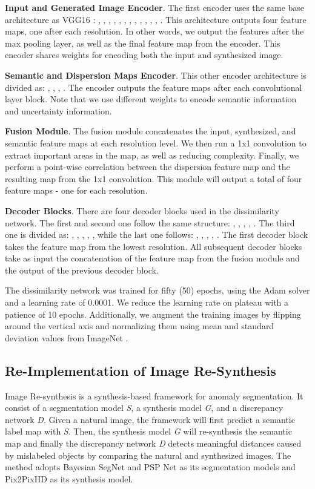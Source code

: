 \documentclass[final]{cvpr}
\begin{document}
\textbf{Input and Generated Image Encoder}. The first encoder uses the same base architecture as VGG16 \cite{vgg}:  , , , , , , , , , , , , . This architecture outputs four feature maps, one after each resolution. In other words, we output the features after the max pooling layer, as well as the final feature map from the encoder. This encoder shares weights for encoding both the input and synthesized image. 

\textbf{Semantic and Dispersion Maps Encoder}. This other encoder architecture is divided as: , , , . The encoder outputs the feature maps after each convolutional layer block. Note that we use different weights to encode semantic information and uncertainty information. 

 \textbf{Fusion Module}. The fusion module concatenates the input, synthesized, and semantic feature maps at each resolution level. We then run a 1x1 convolution to extract important areas in the map, as well as reducing complexity. Finally, we perform a point-wise correlation between the dispersion feature map and the resulting map from the 1x1 convolution. This module will output a total of four feature maps - one for each resolution.  
 
  \textbf{Decoder Blocks}. There are four decoder blocks used in the dissimilarity network. The first and second one follow the same structure: , , , , . The third one is divided as: , , , , , while the last one follows: , , , , . The first decoder block takes the feature map from the lowest resolution. All subsequent decoder blocks take as input the concatenation of the feature map from the fusion module and the output of the previous decoder block.

The dissimilarity network was trained for fifty (50) epochs, using the Adam \cite{adam} solver and a learning rate of 0.0001. We reduce the learning rate on plateau with a patience of 10 epochs. Additionally, we augment the training images by flipping around the vertical axis and normalizing them using mean and standard deviation values from ImageNet \cite{imagenet}.

\subsection{Re-Implementation of Image Re-Synthesis}
\label{app:image_synthesis}
Image Re-synthesis \cite{epfl} is a synthesis-based framework for anomaly segmentation. It consist of a segmentation model \emph{S}, a synthesis model \emph{G}, and a discrepancy network \emph{D}. Given a natural image, the framework will first predict a semantic label map with \emph{S}. Then, the synthesis model \emph{G} will re-synthesis the semantic map and finally the discrepancy network \emph{D} detects meaningful distances caused by mislabeled objects by comparing the natural and synthesized images.
The method adopts Bayesian SegNet \cite{BayesNet} and PSP Net \cite{PSPNet} as its segmentation models and Pix2PixHD \cite{Pix2PixHd} as its synthesis model. 
\end{document}
